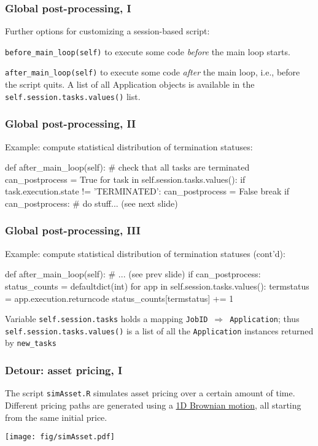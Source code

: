 \documentclass[english,serif,mathserif,xcolor=pdftex,dvipsnames,table]{beamer}
\begin{document}
\begin{frame}
  \frametitle{Global post-processing, I}
Further options for customizing a session-based script:

\+
\begin{describe}{\lstinline|before_main_loop(self)|}
  to execute some code \emph{before} the main loop starts.
\end{describe}

\+
\begin{describe}{\lstinline|after_main_loop(self)|}
  to execute some code \emph{after} the main loop, i.e., before the script
  quits. A list of all Application objects is available in the
  \lstinline|self.session.tasks.values()| list.
\end{describe}
\end{frame}


\begin{frame}[fragile]
  \frametitle{Global post-processing, II}
  Example: compute statistical distribution of termination statuses:

  \begin{python}
def after_main_loop(self):
  # check that all tasks are terminated
  can_postprocess = True
  for task in self.session.tasks.values():
    if task.execution.state != 'TERMINATED':
      can_postprocess = False
      break
  if can_postprocess:
    # do stuff... (see next slide)
  \end{python}
\end{frame}


\begin{frame}[fragile]
  \frametitle{Global post-processing, III}
  Example: compute statistical distribution of termination statuses (cont'd):

  \begin{python}
def after_main_loop(self):
  # ... (see prev slide)
  if can_postprocess:
    status_counts = defaultdict(int)
    for app in self.session.tasks.values():
      termstatus = app.execution.returncode
      status_counts[termstatus] += 1
  \end{python}

  \+\small Variable \lstinline|self.session.tasks| holds a mapping
  \lstinline|JobID|~$\Rightarrow$~\lstinline|Application|; thus
  \lstinline|self.session.tasks.values()| is a list of all the
  \texttt{Application} instances returned by \lstinline|new_tasks|
\end{frame}


\begin{frame}
  \frametitle{Detour: asset pricing, I}
  \small The script \texttt{simAsset.R} simulates asset pricing over a certain
  amount of time. Different pricing paths are generated using a
  \href{https://en.wikipedia.org/wiki/Wiener_process}{1D Brownian motion},
  all starting from the same initial price.
  \begin{center}
    \texttt{[image: fig/simAsset.pdf]}
  \end{center}
\end{frame}
\end{document}
